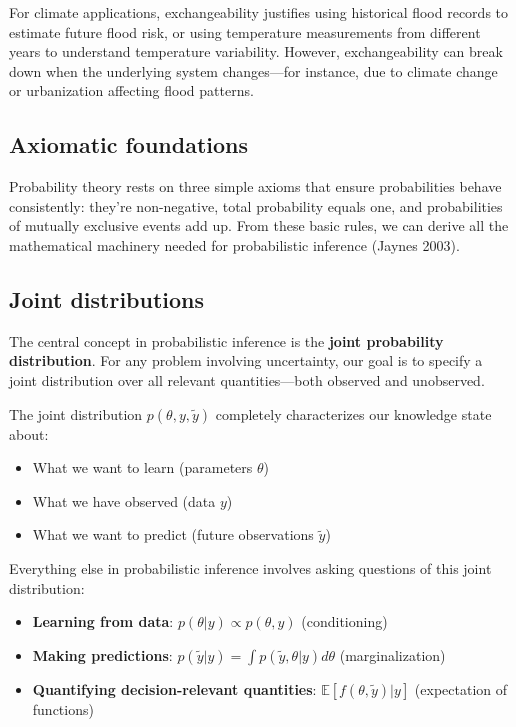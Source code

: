 \documentclass[
  letterpaper,
  DIV=11,
  numbers=noendperiod]{scrreprt}
\providecommand{\tightlist}{%
  \setlength{\itemsep}{0pt}\setlength{\parskip}{0pt}}
\begin{document}
For climate applications, exchangeability justifies using historical
flood records to estimate future flood risk, or using temperature
measurements from different years to understand temperature variability.
However, exchangeability can break down when the underlying system
changes---for instance, due to climate change or urbanization affecting
flood patterns.

\subsection{Axiomatic foundations}\label{axiomatic-foundations}

Probability theory rests on three simple axioms that ensure
probabilities behave consistently: they're non-negative, total
probability equals one, and probabilities of mutually exclusive events
add up. From these basic rules, we can derive all the mathematical
machinery needed for probabilistic inference (Jaynes 2003).

\subsection{Joint distributions}\label{joint-distributions}

The central concept in probabilistic inference is the \textbf{joint
probability distribution}. For any problem involving uncertainty, our
goal is to specify a joint distribution over all relevant
quantities---both observed and unobserved.

The joint distribution \(p(\theta, y, \tilde{y})\) completely
characterizes our knowledge state about:

\begin{itemize}
\tightlist
\item
  What we want to learn (parameters \(\theta\))
\item
  What we have observed (data \(y\))\\
\item
  What we want to predict (future observations \(\tilde{y}\))
\end{itemize}

Everything else in probabilistic inference involves asking questions of
this joint distribution:

\begin{itemize}
\tightlist
\item
  \textbf{Learning from data}: \(p(\theta | y) \propto p(\theta, y)\)
  (conditioning)
\item
  \textbf{Making predictions}:
  \(p(\tilde{y} | y) = \int p(\tilde{y}, \theta | y) d\theta\)
  (marginalization)
\item
  \textbf{Quantifying decision-relevant quantities}:
  \(\mathbb{E}[f(\theta, \tilde{y}) | y]\) (expectation of functions)
\end{itemize}
\end{document}
